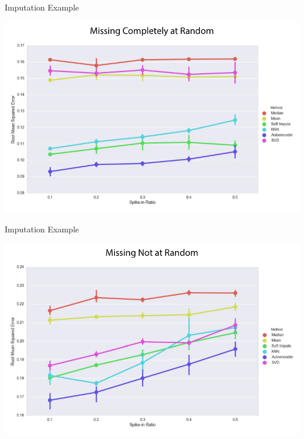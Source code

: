 \documentclass[10pt, xcolor=table]{beamer}
\begin{document}
\begin{frame}{Imputation Example}
	\begin{center}
		\includegraphics[width=1\textwidth]{images/paper_mcar.pdf}	
	\end{center}
\end{frame}

\begin{frame}{Imputation Example}
	\begin{center}
		\includegraphics[width=1\textwidth]{images/paper_mnar.pdf}	
	\end{center}
\end{frame}
\end{document}
